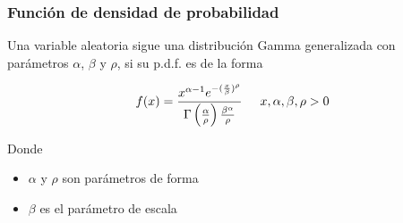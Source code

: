 \begin{frame}
    \frametitle{Función de densidad de probabilidad}

    Una variable aleatoria sigue una distribución Gamma generalizada
    con parámetros $\alpha$, $\beta$ y $\rho$, si su p.d.f. es de la forma

    \begin{equation*}
        f(x) = \frac{x^{\alpha - 1} e^{-(\frac{x}{\beta})^{\rho}}}{\Gamma \left( \frac{\alpha}{\rho} \right) \frac{\beta^\alpha}{\rho}}
        \hspace{0.5cm}
        x, \alpha, \beta, \rho > 0
    \end{equation*}

    Donde

    \begin{itemize}
        \item $\alpha$ y $\rho$ son parámetros de forma
        \item $\beta$ es el parámetro de escala
    \end{itemize}

    \cite{theory1}
\end{frame}
